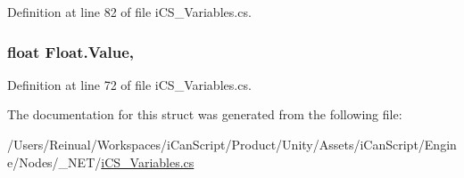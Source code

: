 Definition at line 82 of file i\+C\+S\+\_\+\+Variables.\+cs.

\hypertarget{struct_float_abf7787573f5748d6b7d6fdea53295c9f}{
\subsubsection[{Value}]{\setlength{\rightskip}{0pt plus 5cm}float Float.\+Value\hspace{0.3cm}{\ttfamily [get]}, {\ttfamily [set]}}}\label{struct_float_abf7787573f5748d6b7d6fdea53295c9f}


Definition at line 72 of file i\+C\+S\+\_\+\+Variables.\+cs.



The documentation for this struct was generated from the following file\+:\begin{DoxyCompactItemize}
\item 
/\+Users/\+Reinual/\+Workspaces/i\+Can\+Script/\+Product/\+Unity/\+Assets/i\+Can\+Script/\+Engine/\+Nodes/\+\_\+\+N\+E\+T/\hyperlink{i_c_s___variables_8cs}{i\+C\+S\+\_\+\+Variables.\+cs}\end{DoxyCompactItemize}
